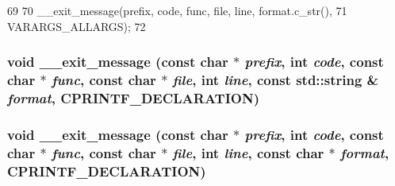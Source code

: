 \begin{DoxyCode}
69 {
70     __exit_message(prefix, code, func, file, line, format.c_str(),
71                    VARARGS_ALLARGS);
72 }
\end{DoxyCode}
\hypertarget{base_2misc_8hh_ac0c54a494dc5058898ba1605983ed96a}{
\subsubsection[{\_\-\_\-exit\_\-message}]{\setlength{\rightskip}{0pt plus 5cm}void \_\-\_\-exit\_\-message (const char $\ast$ {\em prefix}, \/  int {\em code}, \/  const char $\ast$ {\em func}, \/  const char $\ast$ {\em file}, \/  int {\em line}, \/  const std::string \& {\em format}, \/  CPRINTF\_\-DECLARATION)}}
\label{base_2misc_8hh_ac0c54a494dc5058898ba1605983ed96a}
\hypertarget{base_2misc_8hh_a68e6d3e89c7b311b8f828b7e73eda1a8}{
\subsubsection[{\_\-\_\-exit\_\-message}]{\setlength{\rightskip}{0pt plus 5cm}void \_\-\_\-exit\_\-message (const char $\ast$ {\em prefix}, \/  int {\em code}, \/  const char $\ast$ {\em func}, \/  const char $\ast$ {\em file}, \/  int {\em line}, \/  const char $\ast$ {\em format}, \/  CPRINTF\_\-DECLARATION)}}
\label{base_2misc_8hh_a68e6d3e89c7b311b8f828b7e73eda1a8}


